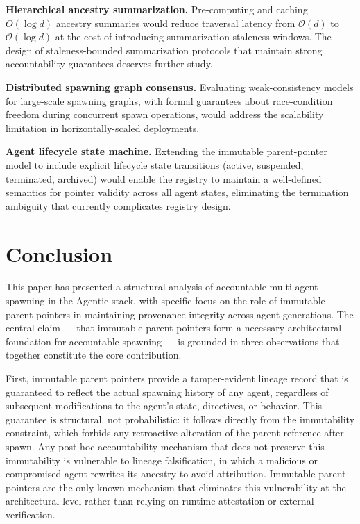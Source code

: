 \textbf{Hierarchical ancestry summarization.} Pre-computing and caching
$O(\log d)$ ancestry summaries would reduce traversal latency from
$\mathcal{O}(d)$ to $\mathcal{O}(\log d)$ at the cost of introducing
summarization staleness windows. The design of staleness-bounded
summarization protocols that maintain strong accountability guarantees
deserves further study.

\textbf{Distributed spawning graph consensus.} Evaluating weak-consistency
models for large-scale spawning graphs, with formal guarantees about
race-condition freedom during concurrent spawn operations, would address
the scalability limitation in horizontally-scaled deployments.

\textbf{Agent lifecycle state machine.} Extending the immutable
parent-pointer model to include explicit lifecycle state transitions
(active, suspended, terminated, archived) would enable the registry to
maintain a well-defined semantics for pointer validity across all agent
states, eliminating the termination ambiguity that currently complicates
registry design.

\section{Conclusion}

This paper has presented a structural analysis of accountable
multi-agent spawning in the Agentic stack, with specific focus on the
role of immutable parent pointers in maintaining provenance integrity
across agent generations. The central claim — that immutable parent
pointers form a necessary architectural foundation for accountable
spawning — is grounded in three observations that together constitute
the core contribution.

First, immutable parent pointers provide a tamper-evident lineage
record that is guaranteed to reflect the actual spawning history of any
agent, regardless of subsequent modifications to the agent's state,
directives, or behavior. This guarantee is structural, not
probabilistic: it follows directly from the immutability constraint,
which forbids any retroactive alteration of the parent reference after
spawn. Any post-hoc accountability mechanism that does not preserve this
immutability is vulnerable to lineage falsification, in which a
malicious or compromised agent rewrites its ancestry to avoid
attribution. Immutable parent pointers are the only known mechanism
that eliminates this vulnerability at the architectural level rather
than relying on runtime attestation or external verification.

